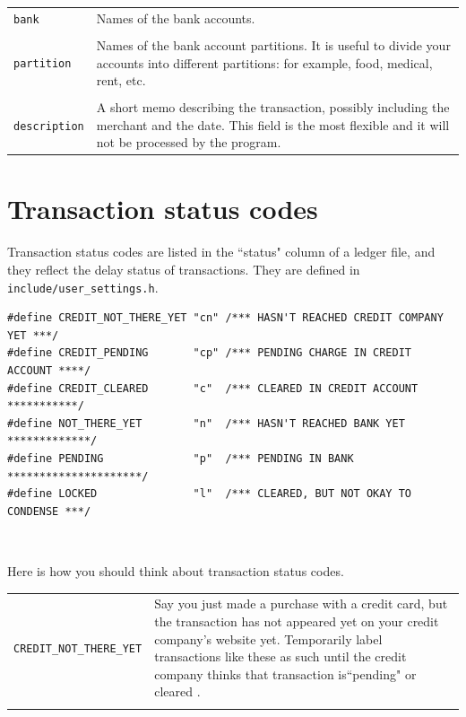 \documentclass{article}
\providecommand{\q}{$\quad$ \newline}
\begin{document}
\begin{flushleft}
\begin{center}
\begin{tabular}{lp{11cm}}
{\tt bank} & Names of the bank accounts. \\ \\

{\tt partition} & Names of the bank account partitions. It is useful to divide your accounts into different partitions: for example, food, medical, rent, etc. \\ \\

{\tt description} & A short memo describing the transaction, possibly including the merchant and the date. This field is the most flexible and it will not be processed by the program.
 
\end{tabular}
\end{center}

\section{Transaction status codes} \label{sec:codes}

\paragraph{} Transaction status codes are listed in the ``status" column of a ledger file, and they reflect the delay status of transactions. They are defined in {\tt include/user\_settings.h}. \q

\begin{lstlisting}
#define CREDIT_NOT_THERE_YET "cn" /*** HASN'T REACHED CREDIT COMPANY YET ***/
#define CREDIT_PENDING       "cp" /*** PENDING CHARGE IN CREDIT ACCOUNT ****/
#define CREDIT_CLEARED       "c"  /*** CLEARED IN CREDIT ACCOUNT ***********/
#define NOT_THERE_YET        "n"  /*** HASN'T REACHED BANK YET *************/
#define PENDING              "p"  /*** PENDING IN BANK *********************/
#define LOCKED               "l"  /*** CLEARED, BUT NOT OKAY TO CONDENSE ***/
\end{lstlisting} \q

Here is how you should think about transaction status codes. \q

\begin{center}
\begin{tabular}{lp{11cm}}
 {\tt CREDIT\_NOT\_THERE\_YET} & Say you just made a purchase with a credit card, but the transaction has not appeared yet on your credit company's website yet. Temporarily label transactions like these as such until the credit company thinks  that transaction is``pending"  or cleared . \\ \\


\end{tabular}
\end{center}
\end{flushleft}
\end{document}
